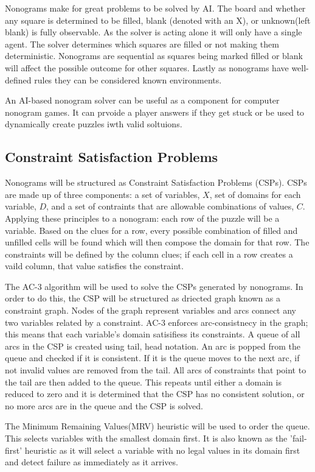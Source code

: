 \documentclass[12pt, letterpaper]
{article}
\begin{document}
    Nonograms make for great problems to be solved by AI. The board and whether any square is determined to be filled, blank (denoted with an X), or unknown(left blank) is fully observable. As the solver is acting alone it will only have a single agent. The solver determines which squares are filled or not making them deterministic. Nonograms are sequential as squares being marked filled or blank will affect the possible outcome for other squares. Lastly as nonograms have well-defined rules they can be considered known environments. 
    
    An AI-based nonogram solver can be useful as a component for computer nonogram games. It can prvoide a player answers if they get stuck or be used to dynamically create puzzles iwth valid soltuions.

    \subsection{Constraint Satisfaction Problems}
    Nonograms will be structured as Constraint Satisfaction Problems (CSPs). CSPs are made up of three components: a set of variables, $X$, set of domains for each variable, $D$, and a set of contraints that are allowable combinations of values, $C$. Applying these principles to a nonogram: each row of the puzzle will be a variable. Based on the clues for a row, every possible combination of filled and unfilled cells will be found which will then compose the domain for that row. The constraints will be defined by the column clues; if each cell in a row creates a vaild column, that value satisfies the constraint.

    The AC-3 algorithm will be used to solve the CSPs generated by nonograms. In order to do this, the CSP will be structured as  driected graph known as a constraint graph. Nodes of the graph represent variables and arcs connect any two variables related by a constraint. AC-3 enforces arc-consistnecy in the graph; this means that each variable's domain satisifiess its constraints. A queue of all arcs in the CSP is created using tail, head notation. An arc is popped from the queue and checked if it is consistent. If it is the queue moves to the next arc, if not invalid values are removed from the tail. All arcs of constraints that point to the tail are then added to the queue. This repeats until either a domain is reduced to zero and it is determined that the CSP has no consistent solution, or no more arcs are in the queue and the CSP is solved.

    The Minimum Remaining Values(MRV) heuristic will be used to order the queue. This selects variables with the smallest domain first. It is also known as the 'fail-first' heuristic as it will select a variable with no legal values in its domain first and detect failure as immediately as it arrives. \cite{russell_artificial_2022}
\end{document}
